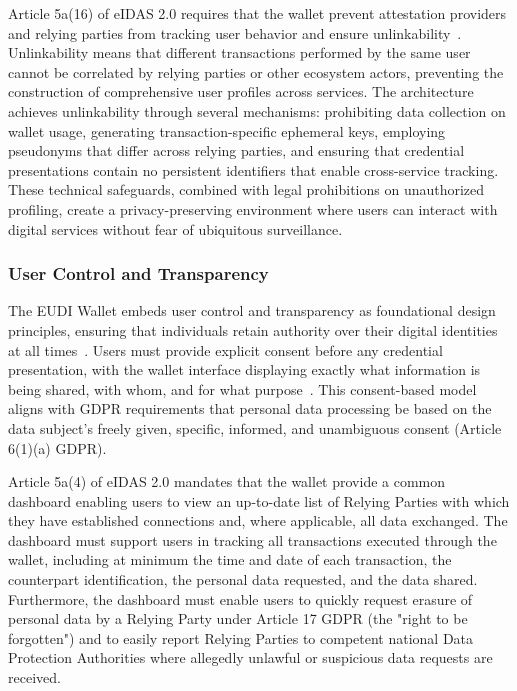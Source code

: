 \documentclass[sigconf,balance,nonacm,authordraft]{acmart}
\begin{document}
Article 5a(16) of eIDAS 2.0 requires that the wallet prevent attestation providers and relying parties from tracking user behavior and ensure unlinkability~\cite{ZKPDiscussion_Article5a,Potential_PrivacyDesign}. Unlinkability means that different transactions performed by the same user cannot be correlated by relying parties or other ecosystem actors, preventing the construction of comprehensive user profiles across services. The architecture achieves unlinkability through several mechanisms: prohibiting data collection on wallet usage, generating transaction-specific ephemeral keys, employing pseudonyms that differ across relying parties, and ensuring that credential presentations contain no persistent identifiers that enable cross-service tracking. These technical safeguards, combined with legal prohibitions on unauthorized profiling, create a privacy-preserving environment where users can interact with digital services without fear of ubiquitous surveillance.

\subsubsection{User Control and Transparency}

The EUDI Wallet embeds user control and transparency as foundational design principles, ensuring that individuals retain authority over their digital identities at all times~\cite{ISC2_GuidingPrinciples,Potential_UserCentricity}. Users must provide explicit consent before any credential presentation, with the wallet interface displaying exactly what information is being shared, with whom, and for what purpose~\cite{ISC2_ConsentRole}. This consent-based model aligns with GDPR requirements that personal data processing be based on the data subject's freely given, specific, informed, and unambiguous consent (Article 6(1)(a) GDPR).

Article 5a(4) of eIDAS 2.0 mandates that the wallet provide a common dashboard enabling users to view an up-to-date list of Relying Parties with which they have established connections and, where applicable, all data exchanged. The dashboard must support users in tracking all transactions executed through the wallet, including at minimum the time and date of each transaction, the counterpart identification, the personal data requested, and the data shared. Furthermore, the dashboard must enable users to quickly request erasure of personal data by a Relying Party under Article 17 GDPR (the "right to be forgotten") and to easily report Relying Parties to competent national Data Protection Authorities where allegedly unlawful or suspicious data requests are received.
\end{document}
